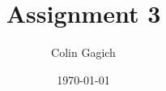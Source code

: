 \documentclass[]{article}
\title{Assignment 3}
\author{Colin Gagich}
\date{\today}
\begin{document}
\maketitle

\section{}
\end{document}
